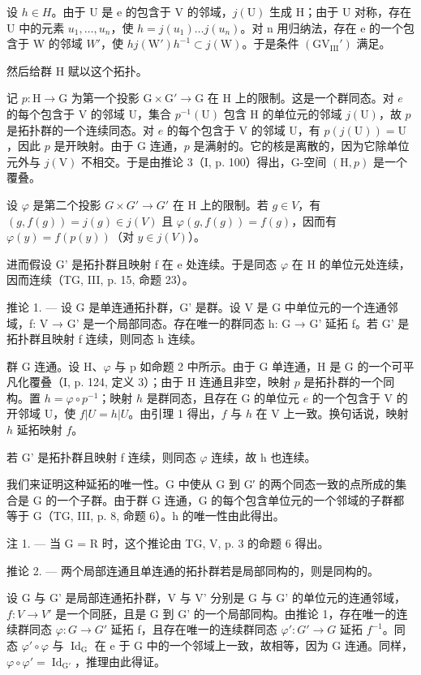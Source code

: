 设 \(h \in H\)。由于 U 是 e 的包含于 V 的邻域，\(j(\mathrm{U})\) 生成 H；由于 U 对称，存在 U 中的元素 \(u_{1}, \ldots, u_{n}\)，使 \(h = j(u_{1}) \ldots j(u_{n})\)。对 n 用归纳法，存在 e 的一个包含于 W 的邻域 \(W'\)，使 \(hj(\mathrm{W}')h^{-1} \subset j(\mathrm{W})\)。于是条件 \((\mathrm{GV}_{\mathrm{III}}')\) 满足。

然后给群 H 赋以这个拓扑。

记 \(p \colon \mathrm{H} \to \mathrm{G}\) 为第一个投影 \(\mathrm{G} \times \mathrm{G}' \to \mathrm{G}\) 在 H 上的限制。这是一个群同态。对 \(e\) 的每个包含于 V 的邻域 U，集合 \(p^{-1}(\mathrm{U})\) 包含 H 的单位元的邻域 \(j(\mathrm{U})\)，故 \(p\) 是拓扑群的一个连续同态。对 \(e\) 的每个包含于 V 的邻域 U，有 \(p(j(\mathrm{U})) = \mathrm{U}\)，因此 \(p\) 是开映射。由于 G 连通，\(p\) 是满射的。它的核是离散的，因为它除单位元外与 \(j(\mathrm{V})\) 不相交。于是由推论 3（I, p. 100）得出，G-空间 \((\mathrm{H}, p)\) 是一个覆叠。

设 \(\varphi\) 是第二个投影 \(G \times G' \to G'\) 在 H 上的限制。若 \(g \in V\)，有 \((g, f(g)) = j(g) \in j(V)\) 且 \(\varphi(g, f(g)) = f(g)\)，因而有 \(\varphi(y) = f(p(y))\)（对 \(y \in j(V)\)）。

进而假设 G' 是拓扑群且映射 f 在 e 处连续。于是同态 \(\varphi\) 在 H 的单位元处连续，因而连续（TG, III, p. 15, 命题 23）。

推论 1. --- 设 G 是单连通拓扑群，G' 是群。设 V 是 G 中单位元的一个连通邻域，f: V → G' 是一个局部同态。存在唯一的群同态 h: G → G' 延拓 f。若 G' 是拓扑群且映射 f 连续，则同态 h 连续。

群 G 连通。设 H、\(\varphi\) 与 p 如命题 2 中所示。由于 G 单连通，H 是 G 的一个可平凡化覆叠（I, p. 124, 定义 3）；由于 H 连通且非空，映射 \(p\) 是拓扑群的一个同构。置 \(h = \varphi \circ p^{-1}\)；映射 \(h\) 是群同态，且存在 G 的单位元 \(e\) 的一个包含于 V 的开邻域 U，使 \(f|U = h|U\)。由引理 1 得出，\(f\) 与 \(h\) 在 V 上一致。换句话说，映射 \(h\) 延拓映射 \(f\)。

若 G' 是拓扑群且映射 f 连续，则同态 \(\varphi\) 连续，故 h 也连续。

我们来证明这种延拓的唯一性。G 中使从 G 到 G′ 的两个同态一致的点所成的集合是 G 的一个子群。由于群 G 连通，G 的每个包含单位元的一个邻域的子群都等于 G（TG, III, p. 8, 命题 6）。h 的唯一性由此得出。

注 1. --- 当 G = R 时，这个推论由 TG, V, p. 3 的命题 6 得出。

推论 2. --- 两个局部连通且单连通的拓扑群若是局部同构的，则是同构的。

设 G 与 G' 是局部连通拓扑群，V 与 V' 分别是 G 与 G' 的单位元的连通邻域，\(f: V \to V'\) 是一个同胚，且是 G 到 G' 的一个局部同构。由推论 1，存在唯一的连续群同态 \(\varphi: G \to G'\) 延拓 f，且存在唯一的连续群同态 \(\varphi': G' \to G\) 延拓 \(f^{-1}\)。同态 \(\varphi' \circ \varphi\) 与 \(\operatorname{Id}_{\mathrm{G}}\) 在 e 于 G 中的一个邻域上一致，故相等，因为 G 连通。同样，\(\varphi \circ \varphi' = \operatorname{Id}_{\mathrm{G}'}\)，推理由此得证。


